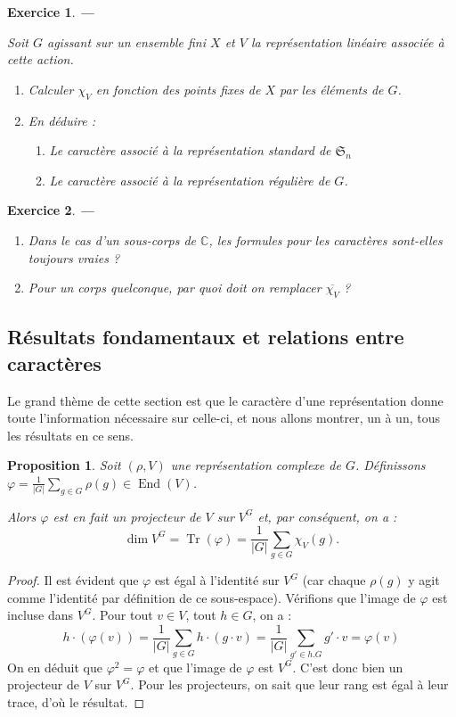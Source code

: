 \documentclass[a4paper]{article}
\newcounter{question}
\newtheorem{enonce}{Exercice}
\newenvironment{exo}[0]{\begin{enonce}{\bf ---}\rm\setcounter{question}{1}}{\end{enonce}}
\theoremstyle{definition} %
\theoremstyle{plain} %
\newtheorem{Prop}[Def]{Proposition} %
\theoremstyle{remark} %
\begin{document}
\begin{exo}

	Soit $G$ agissant sur un ensemble fini $X$ et $V$ la représentation linéaire associée à cette action.
	\begin{enumerate}
	\item Calculer $\chi_V$ en fonction des points fixes de $X$ par les éléments de $G$. 
	\item En déduire : 
	\begin{enumerate}
	\item Le caractère associé à la représentation standard de $\mathfrak{S}_n$
	\item Le caractère associé à la représentation régulière de $G$.
	\end{enumerate}
	\end{enumerate}
\end{exo}

\begin{exo}
\begin{enumerate}
 \item Dans le cas d'un sous-corps de $\mathbb{C}$, les formules pour les caractères sont-elles toujours vraies ?
 \item Pour un corps quelconque, par quoi doit on remplacer $\overline{\chi_V}$ ?
\end{enumerate}
\end{exo}



\subsection{Résultats fondamentaux et relations entre caractères}

Le grand thème de cette section est que le caractère d'une représentation donne toute l'information nécessaire sur celle-ci, et nous allons montrer, un à un, tous les résultats en ce sens.

\begin{Prop}\label{propDimension_espace_invariant}
	Soit $(\rho,V)$ une représentation complexe de $G$.	
	Définissons 
	$\displaystyle \varphi = \frac{1}{|G|} \sum_{g \in G} \rho(g) \in \operatorname{End}(V)$.
	
	Alors $\varphi$ est en fait un projecteur de $V$ sur $V^G$ et, par conséquent, on a :
	$$ \operatorname{dim} V^G = \operatorname{Tr}(\varphi) = \frac{1}{|G|} \sum_{g \in G} \chi_V(g).$$
\end{Prop}

\begin{proof}
	Il est évident que $\varphi$ est égal à l'identité sur $V^G$ (car chaque $\rho(g)$ y agit comme l'identité par définition de ce sous-espace).
	Vérifions que l'image de $\varphi$ est incluse dans $V^G$.
	Pour tout $v \in V$, tout $h \in G$, on a :
	\[
	h \cdot (\varphi(v)) = \frac{1}{|G|} \sum_{g \in G} h \cdot (g \cdot v) = \frac{1}{|G|} \sum_{g' \in h.G} g' \cdot v = \varphi(v)
	\]
	On en déduit que $\varphi^2 = \varphi$ et que l'image de $\varphi$ est $V^G$.
	C'est donc bien un projecteur de $V$ sur $V^G$.
	Pour les projecteurs, on sait que leur rang est égal à leur trace, d'où le résultat.
\end{proof}
\end{document}
